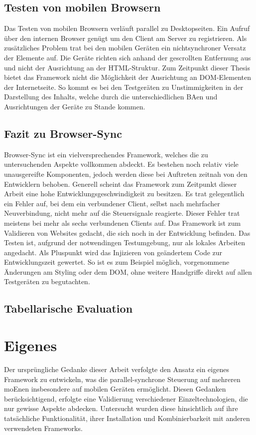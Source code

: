 	\subsection{Testen von mobilen Browsern}
	Das Testen von mobilen Browsern verläuft parallel zu Desktopseiten. Ein Aufruf über den internen Browser genügt um den Client am Server zu registrieren. Als zusätzliches Problem trat bei den mobilen Geräten ein nichtsynchroner Versatz der Elemente auf. Die Geräte richten sich anhand der gescrollten Entfernung aus und nicht der Ausrichtung an der \Gls{HTML}-Struktur. Zum Zeitpunkt dieser Thesis bietet das \Gls{Framework} nicht die Möglichkeit der Ausrichtung an \Gls{DOM}-Elementen der Internetseite. So kommt es bei den Testgeräten zu Unstimmigkeiten in der Darstellung des Inhalts, welche durch die unterschiedlichen \Gls{BA}en und Ausrichtungen der Geräte zu Stande kommen.
	
	\subsection{Fazit zu Browser-Sync}
	Browser-Sync ist ein vielversprechendes \Gls{Framework}, welches die zu untersuchenden Aspekte vollkommen abdeckt. Es bestehen noch relativ viele unausgereifte Komponenten, jedoch werden diese bei Auftreten zeitnah von den Entwicklern behoben. Generell scheint das \Gls{Framework} zum Zeitpunkt dieser Arbeit eine hohe Entwicklungsgeschwindigkeit zu besitzen. Es trat gelegentlich ein Fehler auf, bei dem ein verbundener Client, selbst nach mehrfacher Neuverbindung, nicht mehr auf die Steuersignale reagierte. Dieser Fehler trat meistens bei mehr als sechs verbundenen Clients auf. Das \Gls{Framework} ist zum Validieren von Websites gedacht, die sich noch in der Entwicklung befinden. Das Testen ist, aufgrund der notwendingen Testumgebung, nur als lokales Arbeiten angedacht. Als Pluspunkt wird das Injizieren von geändertem Code zur Entwicklungszeit gewertet. So ist es zum Beispiel möglich, vorgenommene Änderungen am Styling oder dem \Gls{DOM}, ohne weitere Handgriffe direkt auf allen Testgeräten zu begutachten.
	
	\subsection{Tabellarische Evaluation}
	
	
	\section{Eigenes }
	Der ursprüngliche Gedanke dieser Arbeit verfolgte den Ansatz ein eigenes \Gls{Framework} zu entwickeln, was die \gls{parallel-synchron}e Steuerung auf mehreren \Gls{moEn}en insbesondere auf mobilen Geräten ermöglicht. Diesen Gedanken berücksichtigend, erfolgte eine Validierung verschiedener Einzeltechnologien, die nur gewisse Aspekte abdecken. Untersucht wurden diese hinsichtlich auf ihre tatsächliche Funktionalität, ihrer Installation und Kombinierbarkeit mit anderen verwendeten \Gls{Framework}s.
	
